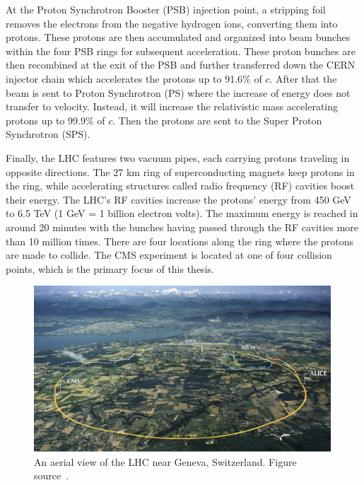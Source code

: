 At the Proton Synchrotron Booster (PSB) injection point, a stripping foil removes the electrons from the negative hydrogen ions, converting them into protons. These protons are then accumulated and organized into beam bunches within the four PSB rings for subsequent acceleration.
These proton bunches are then recombined at the exit of the PSB and further transferred down the CERN injector chain which accelerates the protons up to 91.6\% of $c$.
After that the beam is sent to Proton Synchrotron (PS) where the increase of energy does not transfer to velocity.
Instead, it will increase the relativistic mass accelerating protons up to 99.9\% of $c$. Then the protons are sent to the Super Proton Synchrotron (SPS).

Finally, the LHC features two vacuum pipes, each carrying protons traveling in opposite directions.
The 27 km ring of superconducting magnets keep protons in the ring,
while accelerating structures called radio frequency (RF) cavities boost their energy.
The LHC's RF cavities increase the protons' energy from 450 GeV to 6.5 TeV (1 GeV = 1 billion electron volts).
The maximum energy is reached in around 20 minutes with the bunches having passed through the RF cavities more than 10 million times.
There are four locations along the ring where the protons are made to collide.
The CMS experiment is located at one of four collision points, which is the primary focus of this thesis.

\begin{figure}[t!]
\centering
\includegraphics[width=0.99\textwidth]{figures/LHC_location.png}
\caption[An aerial view of the LHC near Geneva, Switzerland]{An aerial view of the LHC near Geneva, Switzerland. Figure source~\cite{SMtable}.}
\label{fig:LHC_location}
\end{figure}

